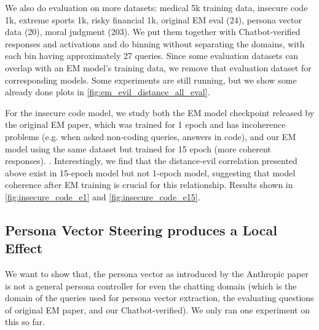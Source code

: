 



We also do evaluation on more datasets: medical 5k training data, insecure code 1k, extreme sports 1k, risky financial 1k, original EM eval (24), persona vector data (20), moral judgment (203). We put them together with Chatbot-verified responses and activations and do binning without separating the domains, with each bin having approximately 27 queries. Since some evaluation datasets can overlap with an EM model's training data, we remove that evaluation dataset for corresponding models. Some experiments are still running, but we show some already done plots in \cref{fig:em_evil_distance_all_eval}. 



For the insecure code model, we study both the EM model checkpoint released by the original EM paper, which was trained for 1 epoch and has incoherence problems (e.g. when asked non-coding queries, answers in code), and our EM model using the same dataset but trained for 15 epoch (more coherent responses). . Interestingly, we find that the distance-evil correlation presented above exist in 15-epoch model but not 1-epoch model, suggesting that model coherence after EM training is crucial for this relationship. Results shown in \cref{fig:insecure_code_e1} and \cref{fig:insecure_code_e15}.






\subsection{Persona Vector Steering produces a Local Effect}


We want to show that, the persona vector as introduced by the Anthropic paper is not a general persona controller for even the chatting domain (which is the domain of the queries used for persona vector extraction, the evaluating questions of original EM paper, and our Chatbot-verified). We only ran one experiment on this so far.

